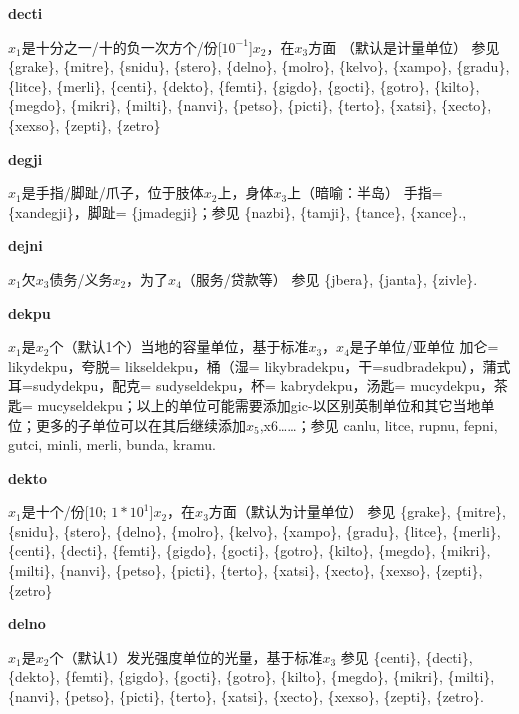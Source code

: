 \documentclass[notitlepage,twocolumn,a4paper,10pt]{book}
\begin{document}
{\sffamily\bfseries decti}\enspace {\ttfamily\bfseries[dec]}  $x_1$是十分之一\slash{}十的负一次方个\slash{}份[$10^{-1}$]$x_2$，在$x_3$方面 （默认是计量单位） \textemdash{} 参见 \{grake\}, \{mitre\}, \{snidu\}, \{stero\}, \{delno\}, \{molro\}, \{kelvo\}, \{xampo\}, \{gradu\}, \{litce\}, \{merli\}, \{centi\}, \{dekto\}, \{femti\}, \{gigdo\}, \{gocti\}, \{gotro\}, \{kilto\}, \{megdo\}, \{mikri\}, \{milti\}, \{nanvi\}, \{petso\}, \{picti\}, \{terto\}, \{xatsi\}, \{xecto\}, \{xexso\}, \{zepti\}, \{zetro\}

{\sffamily\bfseries degji}\enspace {\ttfamily\bfseries[deg]}  $x_1$是手指\slash{}脚趾\slash{}爪子，位于肢体$x_2$上，身体$x_3$上（暗喻：半岛） \textemdash{} 手指= \{xandegji\}，脚趾= \{jmadegji\}；参见 \{nazbi\}, \{tamji\}, \{tance\}, \{xance\}.,

{\sffamily\bfseries dejni}\enspace {\ttfamily\bfseries[dej]}  $x_1$欠$x_3$债务\slash{}义务$x_2$，为了$x_4$（服务\slash{}贷款等） \textemdash{} 参见 \{jbera\}, \{janta\}, \{zivle\}.

{\sffamily\bfseries dekpu} $x_1$是$x_2$个（默认1个）当地的容量单位，基于标准$x_3$，$x_4$是子单位\slash{}亚单位 \textemdash{} 加仑= {likydekpu}，夸脱= {likseldekpu}，桶（湿= {likybradekpu}，干={sudbradekpu}），蒲式耳={sudydekpu}，配克= {sudyseldekpu}，杯= {kabrydekpu}，汤匙= {mucydekpu}，茶匙= {mucyseldekpu}；以上的单位可能需要添加gic-以区别英制单位和其它当地单位；更多的子单位可以在其后继续添加$x_5$,x6……；参见 {canlu}, {litce}, {rupnu}, {fepni}, {gutci}, {minli}, {merli}, {bunda}, {kramu}.

{\sffamily\bfseries dekto}\enspace {\ttfamily\bfseries[dek]}  $x_1$是十个\slash{}份[10; $1*10^1$]$x_2$，在$x_3$方面（默认为计量单位） \textemdash{} 参见 \{grake\}, \{mitre\}, \{snidu\}, \{stero\}, \{delno\}, \{molro\}, \{kelvo\}, \{xampo\}, \{gradu\}, \{litce\}, \{merli\}, \{centi\}, \{decti\}, \{femti\}, \{gigdo\}, \{gocti\}, \{gotro\}, \{kilto\}, \{megdo\}, \{mikri\}, \{milti\}, \{nanvi\}, \{petso\}, \{picti\}, \{terto\}, \{xatsi\}, \{xecto\}, \{xexso\}, \{zepti\}, \{zetro\}

{\sffamily\bfseries delno}\enspace {\ttfamily\bfseries[del     de'o]}  $x_1$是$x_2$个（默认1）发光强度单位的光量，基于标准$x_3$ \textemdash{} 参见 \{centi\}, \{decti\}, \{dekto\}, \{femti\}, \{gigdo\}, \{gocti\}, \{gotro\}, \{kilto\}, \{megdo\}, \{mikri\}, \{milti\}, \{nanvi\}, \{petso\}, \{picti\}, \{terto\}, \{xatsi\}, \{xecto\}, \{xexso\}, \{zepti\}, \{zetro\}.
\end{document}

